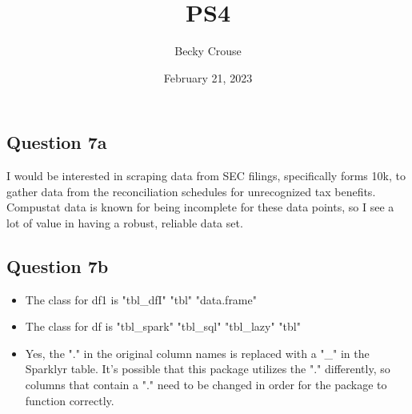 \documentclass[nobib]{MSword}
\title{PS4}
\author{Becky Crouse}
\date{February 21, 2023}
\begin{document}
\maketitle

\subsection*{Question 7a}
I would be interested in scraping data from SEC filings, specifically forms 10k, to gather data from the reconciliation schedules for unrecognized tax benefits. Compustat data is known for being incomplete for these data points, so I see a lot of value in having a robust, reliable data set. 

\subsection*{Question 7b}
\begin{itemize}
  \item The class for df1 is "tbl\_dfI" "tbl" "data.frame"
  \item The class for df is "tbl\_spark" "tbl\_sql" "tbl\_lazy" "tbl"
  \item Yes, the "." in the original column names is replaced with a "\_" in the Sparklyr table. It's possible that this package utilizes the "." differently, so columns that contain a "." need to be changed in order for the package to function correctly. 
\end{itemize}
\end{document}
